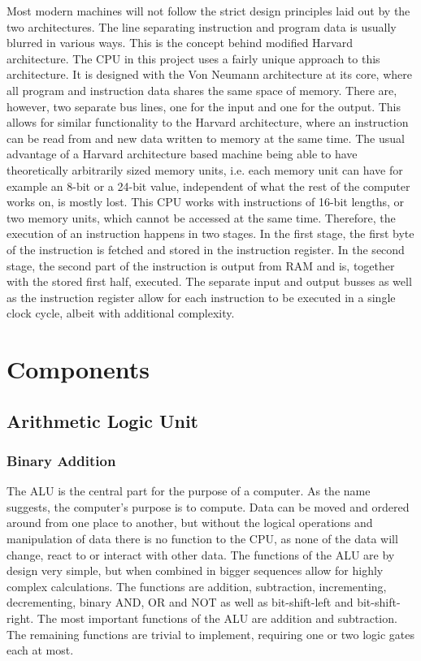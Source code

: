 Most modern machines will not follow the strict design principles laid out by the two architectures. The line separating instruction and program data is usually blurred in various ways. This is the concept behind modified Harvard architecture. The CPU in this project uses a fairly unique approach to this architecture. It is designed with the Von Neumann architecture at its core, where all program and instruction data shares the same space of memory. There are, however, two separate bus lines, one for the input and one for the output. This allows for similar functionality to the Harvard architecture, where an instruction can be read from and new data written to memory at the same time. The usual advantage of a Harvard architecture based machine being able to have theoretically arbitrarily sized memory units, i.e. each memory unit can have for example an 8-bit or a 24-bit value, independent of what the rest of the computer works on, is mostly lost. This CPU works with instructions of 16-bit lengths, or two memory units, which cannot be accessed at the same time. Therefore, the execution of an instruction happens in two stages. In the first stage, the first byte of the instruction is fetched and stored in the instruction register. In the second stage, the second part of the instruction is output from RAM and is, together with the stored first half, executed. The separate input and output busses as well as the instruction register allow for each instruction to be executed in a single clock cycle, albeit with additional complexity.

\section{Components}

\subsection{Arithmetic Logic Unit}
\subsubsection{Binary Addition}
The ALU is the central part for the purpose of a computer. As the name suggests, the computer's purpose is to compute. Data can be moved and ordered around from one place to another, but without the logical operations and manipulation of data there is no function to the CPU, as none of the data will change, react to or interact with other data. The functions of the ALU are by design very simple, but when combined in bigger sequences allow for highly complex calculations. The functions are addition, subtraction, incrementing, decrementing, binary AND, OR and NOT as well as bit-shift-left and bit-shift-right. The most important functions of the ALU are addition and subtraction. The remaining functions are trivial to implement, requiring one or two logic gates each at most.

